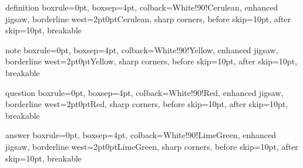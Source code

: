 
\usepackage[dvipsnames]{xcolor} %
\usepackage[many]{tcolorbox} %

\usepackage{amsthm}
\theoremstyle{definition}

\usepackage{listings} %


\newenvironment{definition}{
    \textbf{Definition}
}
    
\tcolorboxenvironment{definition}{
    boxrule=0pt,
    boxsep=4pt, %
    colback={White!90!Cerulean}, %
    enhanced jigsaw, %
    borderline west={2pt}{0pt}{Cerulean},
    sharp corners,
    before skip=10pt,
    after skip=10pt,
    breakable
}

\newenvironment{note}{
    \textbf{Note}
}

\tcolorboxenvironment{note}{
    boxrule=0pt,
    boxsep=4pt, %
    colback={White!90!Yellow}, %
    enhanced jigsaw, %
    borderline west={2pt}{0pt}{Yellow},
    sharp corners,
    before skip=10pt,
    after skip=10pt,
    breakable
}

\newenvironment{question}{
    \textbf{Question}
}

\tcolorboxenvironment{question}{
    boxrule=0pt,
    boxsep=4pt,
    colback={White!90!Red},
    enhanced jigsaw,
    borderline west={2pt}{0pt}{Red},
    sharp corners,
    before skip=10pt,
    after skip=10pt,
    breakable
}

\newenvironment{answer}{
    \textbf{Answer}
}

\tcolorboxenvironment{answer}{
    boxrule=0pt,
    boxsep=4pt,
    colback={White!90!LimeGreen},
    enhanced jigsaw,
    borderline west={2pt}{0pt}{LimeGreen},
    sharp corners,
    before skip=10pt,
    after skip=10pt,
    breakable
}

